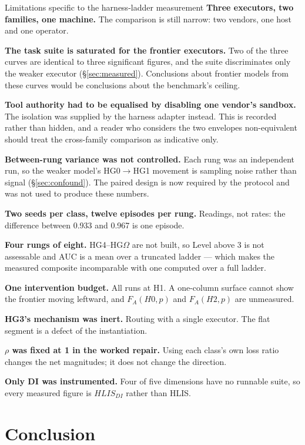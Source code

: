 \documentclass[11pt]{article}
\theoremstyle{definition}
\newcommand{\Om}{\ensuremath{\Omega}}
\begin{document}
\begin{cautionbox}{Limitations specific to the harness-ladder measurement}
\textbf{Three executors, two families, one machine.} The comparison is still narrow: two vendors, one host and one operator.

\textbf{The task suite is saturated for the frontier executors.} Two of the three curves are identical to three significant figures, and the suite discriminates only the weaker executor (\S\ref{sec:measured}). Conclusions about frontier models from these curves would be conclusions about the benchmark's ceiling.

\textbf{Tool authority had to be equalised by disabling one vendor's sandbox.} The isolation was supplied by the harness adapter instead. This is recorded rather than hidden, and a reader who considers the two envelopes non-equivalent should treat the cross-family comparison as indicative only.

\textbf{Between-rung variance was not controlled.} Each rung was an independent run, so the weaker model's HG0$\to$HG1 movement is sampling noise rather than signal (\S\ref{sec:confound}). The paired design is now required by the protocol and was not used to produce these numbers.

\textbf{Two seeds per class, twelve episodes per rung.} Readings, not rates: the difference between 0.933 and 0.967 is one episode.

\textbf{Four rungs of eight.} HG4--HG\Om{} are not built, so Level above 3 is not assessable and AUC is a mean over a truncated ladder --- which makes the measured composite incomparable with one computed over a full ladder.

\textbf{One intervention budget.} All runs at H1. A one-column surface cannot show the frontier moving leftward, and $F_A(H0,p)$ and $F_A(H2,p)$ are unmeasured.

\textbf{HG3's mechanism was inert.} Routing with a single executor. The flat segment is a defect of the instantiation.

\textbf{$\rho$ was fixed at 1 in the worked repair.} Using each class's own loss ratio changes the net magnitudes; it does not change the direction.

\textbf{Only DI was instrumented.} Four of five dimensions have no runnable suite, so every measured figure is $HLIS_{DI}$ rather than HLIS.
\end{cautionbox}

\section{Conclusion}
\end{document}
